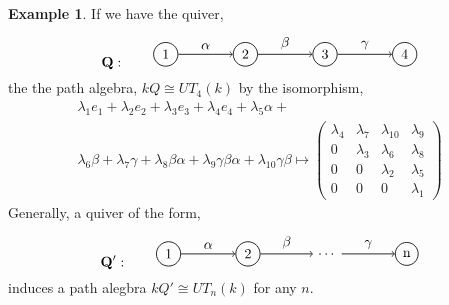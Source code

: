 \documentclass[11.5pt, twoside, a4paper, titlepage]{report}
\theoremstyle{definition}
\newtheorem{eg}[mydef]{Example}
\theoremstyle{plain}
\begin{document}
\begin{eg} \label{UTpathalgebraeg}
If we have the quiver,
\begin{equation*}
\mathbf{Q}: \qquad
\begin{tikzpicture}[->,-latex, auto, every path/.style={->, semithick}, main node/.style={draw, circle}]
\node	[main node]		(1) at (0,0)		{1};
\node [main node]		(2) at (2,0)		{2};
\node [main node]		(3) at (4,0)		{3};
\node [main node]		(4) at (6,0)		{4};

\draw (1) edge node [auto] {$\alpha$} (2);
\draw (2) edge node [auto] {$\beta$} (3);
\draw (3) edge node [auto] {$\gamma$} (4);
\end{tikzpicture}
\end{equation*}
the the path algebra, $kQ \cong UT_4(k)$ by the isomorphism,
\begin{multline*}
\lambda_1e_1+\lambda_2e_2+\lambda_3e_3+\lambda_4e_4+\lambda_5\alpha+\\
\lambda_6\beta+\lambda_7\gamma+\lambda_8\beta\alpha+\lambda_9\gamma\beta\alpha+\lambda_{10}\gamma\beta
\mapsto
\begin{pmatrix*}
\lambda_4 & \lambda_7 & \lambda_{10} & \lambda_9 \\
0 & \lambda_3 & \lambda_6 & \lambda_{8}\\
0 & 0 & \lambda_2 & \lambda_5 \\
0 & 0 & 0 & \lambda_1
\end{pmatrix*}
\end{multline*}
Generally, a quiver of the form,
\begin{equation*}
\mathbf{Q'}: \qquad
\begin{tikzpicture}[->,-latex, auto, every path/.style={->, semithick}, main node/.style={draw, circle}]
\node	[main node]		(1) at (0,0)		{1};
\node [main node]		(2) at (2,0)		{2};
\node []			(3) at (4,0)		{$\dots$};
\node [main node]		(4) at (6,0)		{n};

\draw (1) edge node [auto] {$\alpha$} (2);
\draw (2) edge node [auto] {$\beta$} (3);
\draw (3) edge node [auto] {$\gamma$} (4);
\end{tikzpicture}
\end{equation*}
induces a path alegbra $kQ' \cong UT_n(k)$ for any $n$.
\end{eg}
\end{document}
